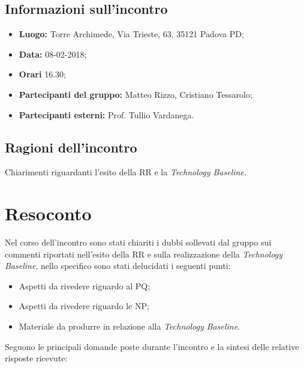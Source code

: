 \documentclass[openany,12pt,a4paper]{article}
\begin{document}
  \subsection{Informazioni sull'incontro} 
   
  \begin{itemize}  
      \item \textbf{Luogo:} Torre Archimede, Via Trieste, 63, 35121 Padova PD;
      \item \textbf{Data:} 08-02-2018; 
      \item \textbf{Orari} 16.30;
      \item \textbf{Partecipanti del gruppo:} Matteo Rizzo, Cristiano Tessarolo; 
      \item \textbf{Partecipanti esterni:} Prof. Tullio Vardanega. 
  \end{itemize} 
 
  \subsection{Ragioni dell'incontro} 
  Chiarimenti riguardanti l'esito della RR e la \textit{Technology Baseline}. 
 
  \section{Resoconto} 
  Nel corso dell'incontro sono stati chiariti i dubbi sollevati dal gruppo sui commenti riportati nell'esito della RR e sulla realizzazione della \textit{Technology Baseline}, nello specifico sono stati delucidati i seguenti punti:
	
  \begin{itemize}
	\item Aspetti da rivedere riguardo al PQ;
	\item Aspetti da rivedere riguardo le NP;
	\item Materiale da produrre in relazione alla \textit{Technology Baseline}.
  \end{itemize}
	
  \noindent Seguono le principali domande poste durante l'incontro e la sintesi delle relative risposte ricevute:
\end{document}
